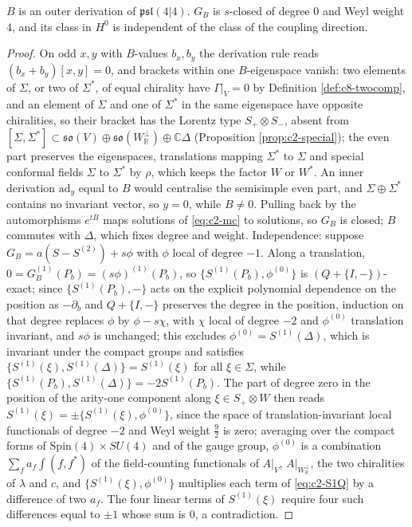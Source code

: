 \begin{proposition}
\label{prop:c8-B}
$B$ is an outer derivation of $\mathfrak{psl}(4|4)$. $G_B$ is $s$-closed of degree $0$ and Weyl weight $4$, and its class in $H^0$ is independent of the class of the coupling direction.
\end{proposition}

\begin{proof}
On odd $x,y$ with $B$-values $b_x,b_y$ the derivation rule reads $(b_x+b_y)[x,y]=0$, and brackets within one $B$-eigenspace vanish: two elements of $\Sigma$, or two of $\Sigma^*$, of equal chirality have $\Gamma|_V=0$ by Definition \ref{def:c8-twocomp}, and an element of $\Sigma$ and one of $\Sigma^*$ in the same eigenspace have opposite chiralities, so their bracket has the Lorentz type $S_+\otimes S_-$, absent from $[\Sigma,\Sigma^*]\subset\mathfrak{so}(V)\oplus\mathfrak{so}(W_{\mathbb R}^\perp)\oplus\mathbb C\Delta$ (Proposition \ref{prop:c2-special}); the even part preserves the eigenspaces, translations mapping $\Sigma^*$ to $\Sigma$ and special conformal fields $\Sigma$ to $\Sigma^*$ by $\rho$, which keeps the factor $W$ or $W^*$. An inner derivation $\mathrm{ad}_y$ equal to $B$ would centralise the semisimple even part, and $\Sigma\oplus\Sigma^*$ contains no invariant vector, so $y=0$, while $B\neq0$. Pulling back by the automorphisms $e^{tB}$ maps solutions of \eqref{eq:c2-mc} to solutions, so $G_B$ is closed; $B$ commutes with $\Delta$, which fixes degree and weight. Independence: suppose $G_B=a(S-S^{(2)})+s\phi$ with $\phi$ local of degree $-1$. Along a translation, $0=G_B^{(1)}(P_b)=(s\phi)^{(1)}(P_b)$, so $\{S^{(1)}(P_b),\phi^{(0)}\}$ is $(Q+\{I,-\})$-exact; since $\{S^{(1)}(P_b),-\}$ acts on the explicit polynomial dependence on the position as $-\partial_b$ and $Q+\{I,-\}$ preserves the degree in the position, induction on that degree replaces $\phi$ by $\phi-s\chi$, with $\chi$ local of degree $-2$ and $\phi^{(0)}$ translation invariant, and $s\phi$ is unchanged; this excludes $\phi^{(0)}=S^{(1)}(\Delta)$, which is invariant under the compact groups and satisfies $\{S^{(1)}(\xi),S^{(1)}(\Delta)\}=S^{(1)}(\xi)$ for all $\xi\in\Sigma$, while $\{S^{(1)}(P_b),S^{(1)}(\Delta)\}=-2S^{(1)}(P_b)$. The part of degree zero in the position of the arity-one component along $\xi\in S_+\otimes W$ then reads $S^{(1)}(\xi)=\pm\{S^{(1)}(\xi),\phi^{(0)}\}$, since the space of translation-invariant local functionals of degree $-2$ and Weyl weight $\tfrac92$ is zero; averaging over the compact forms of $\mathrm{Spin}(4)\times SU(4)$ and of the gauge group, $\phi^{(0)}$ is a combination $\sum_fa_f\int(f,f^*)$ of the field-counting functionals of $A|_V$, $A|_{W_{\mathbb R}^\perp}$, the two chiralities of $\lambda$ and $c$, and $\{S^{(1)}(\xi),\phi^{(0)}\}$ multiplies each term of \eqref{eq:c2-S1Q} by a difference of two $a_f$. The four linear terms of $S^{(1)}(\xi)$ require four such differences equal to $\pm1$ whose sum is $0$, a contradiction.
\end{proof}

